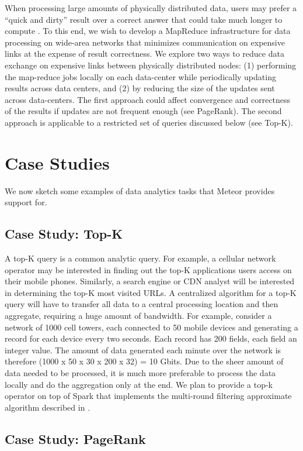 \documentclass{article}
\begin{document}
When processing large amounts of physically distributed data, users may prefer a “quick and dirty” result over a correct answer that could take much longer to compute \cite{3, 4}. To this end, we wish to develop a MapReduce infrastructure for data processing on wide-area networks that minimizes communication on expensive links at the expense of result correctness. We explore two ways to reduce data exchange on expensive links between physically distributed nodes: (1) performing the map-reduce jobs locally on each data-center while periodically updating results across data centers, and (2) by reducing the size of the updates sent across data-centers. The first approach could affect convergence and correctness of the results if updates are not frequent enough (see PageRank). The second approach is applicable to a restricted set of queries discussed below (see Top-K).

\section{Case Studies}

We now sketch some examples of data analytics tasks that Meteor provides support for. 

\subsection{Case Study: Top-K}

A top-K query is a common analytic query. For example, a cellular network operator may be interested in finding out the top-K applications users access on their mobile phones. Similarly, a search engine or CDN analyst will be interested in determining the top-K most visited URLs. 
A centralized algorithm for a top-K query will have to transfer all data to a central processing location and then aggregate, requiring a huge amount of bandwidth. For example, consider a network of 1000 cell towers, each connected to 50 mobile devices and generating a record for each device every two seconds. Each record has 200 fields, each field an integer value. The amount of data generated each minute over the network is therefore (1000 x 50 x 30 x 200 x 32) = 10 Gbits. Due to the sheer amount of data needed to be processed, it is much more preferable to process the data locally and do the aggregation only at the end. We plan to provide a top-k operator on top of Spark that implements the multi-round filtering approximate algorithm described in \cite{3}.

\subsection{Case Study: PageRank}
\end{document}
